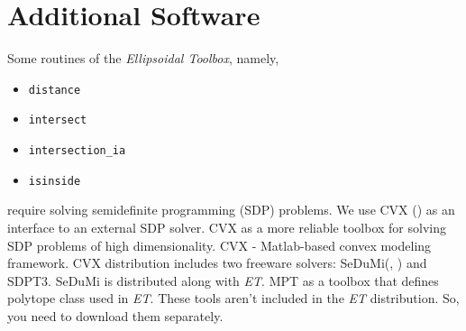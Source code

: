 \section{Additional Software}
Some routines of the {\it Ellipsoidal Toolbox}, namely,
\begin{itemize}
\item {\tt distance}
\item {\tt intersect}
\item {\tt intersection\_ia}
\item {\tt isinside}
\end{itemize}
require solving semidefinite programming (SDP) problems.
We use CVX (\cite{cvxhp}) as an
interface to an external SDP solver. CVX as a more reliable toolbox
for solving SDP problems of high dimensionality. CVX - Matlab-based
convex modeling framework. CVX distribution includes two freeware
solvers: SeDuMi(\cite{sedumi}, \cite{sedumihp})
and SDPT3. SeDuMi  is distributed
along with {\it ET}. 
\newline
MPT as a toolbox that defines polytope class
used in {\it ET}.
\newline
These tools aren't included in the {\it ET} distribution. 
So, you need to download them separately. 



